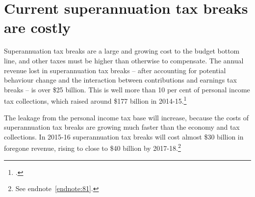 \section{Current superannuation tax breaks are costly}\label{sec:SUPER-2-8}
Superannuation tax breaks are a large and growing cost to the budget bottom line, and other taxes must be higher than otherwise to compensate. The annual revenue lost in superannuation tax breaks – after accounting for potential behaviour change and the interaction between contributions and earnings tax breaks – is over \$25 billion.%
\label{endnote:81}
This is well more than 10 per cent of personal income tax collections, which raised around \$177 billion in 2014-15.\footcite[][4--14]{Treasury2015BudgetPapers201516}

The leakage from the personal income tax base will increase, because the costs of superannuation tax breaks are growing much faster than the economy and tax collections. 
In 2015-16 superannuation tax breaks will cost almost \$30 billion in foregone revenue, rising to close to \$40 billion by 2017-18.\footnote{See endnote~\ref{endnote:81}.}

